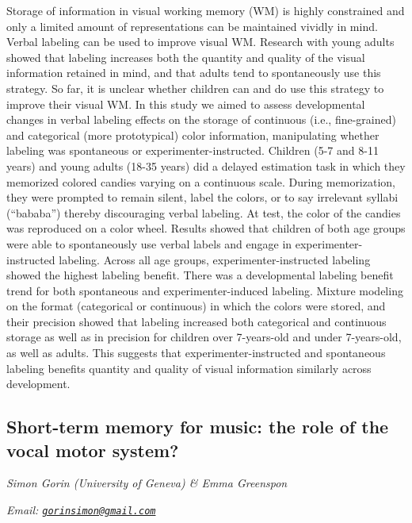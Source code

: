 \documentclass[
  12pt,
]{book}
\begin{document}
Storage of information in visual working memory (WM) is highly constrained and only a limited amount of representations can be maintained vividly in mind. Verbal labeling can be used to improve visual WM. Research with young adults showed that labeling increases both the quantity and quality of the visual information retained in mind, and that adults tend to spontaneously use this strategy. So far, it is unclear whether children can and do use this strategy to improve their visual WM. In this study we aimed to assess developmental changes in verbal labeling effects on the storage of continuous (i.e., fine-grained) and categorical (more prototypical) color information, manipulating whether labeling was spontaneous or experimenter-instructed. Children (5-7 and 8-11 years) and young adults (18-35 years) did a delayed estimation task in which they memorized colored candies varying on a continuous scale. During memorization, they were prompted to remain silent, label the colors, or to say irrelevant syllabi (``bababa'') thereby discouraging verbal labeling. At test, the color of the candies was reproduced on a color wheel. Results showed that children of both age groups were able to spontaneously use verbal labels and engage in experimenter-instructed labeling. Across all age groups, experimenter-instructed labeling showed the highest labeling benefit. There was a developmental labeling benefit trend for both spontaneous and experimenter-induced labeling. Mixture modeling on the format (categorical or continuous) in which the colors were stored, and their precision showed that labeling increased both categorical and continuous storage as well as in precision for children over 7-years-old and under 7-years-old, as well as adults. This suggests that experimenter-instructed and spontaneous labeling benefits quantity and quality of visual information similarly across development.

\hypertarget{short-term-memory-for-music-the-role-of-the-vocal-motor-system}{%
\subsection{Short-term memory for music: the role of the vocal motor system?}\label{short-term-memory-for-music-the-role-of-the-vocal-motor-system}}

\emph{Simon Gorin (University of Geneva) \& Emma Greenspon}

\emph{Email: \href{mailto:gorinsimon@gmail.com}{\nolinkurl{gorinsimon@gmail.com}}}
\end{document}
